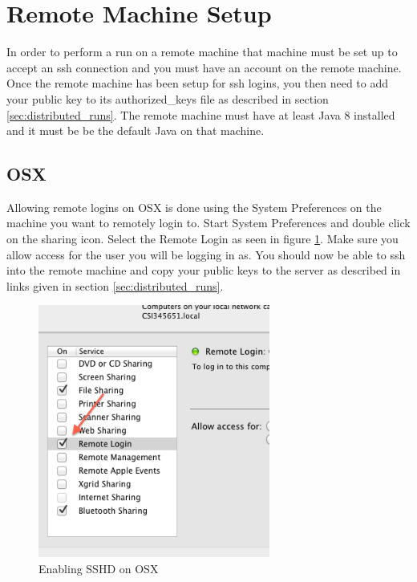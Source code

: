 \documentclass[11pt]{amsart}
\begin{document}
\section{Remote Machine Setup}
\label{sec:remote_machines}

In order to perform a run on a remote machine that machine must be set up to accept an ssh connection and you must have an account on the remote machine. Once the remote machine has been setup for ssh logins, you then need to add your public key to its authorized\_keys file as described in section \ref{sec:distributed_runs}. The remote machine must have at least Java 8 installed and it must be be the default Java on that machine.

\subsection{OSX }
Allowing remote logins on OSX is done using the System Preferences on the machine you want to remotely login to. Start System Preferences and double click on the sharing icon. Select the Remote Login as seen in figure \ref{fig:osx_sys}. Make sure you allow access for the user you will be logging in as. You should now be able to ssh into the remote machine and copy your public keys to the server as described in links given in section \ref{sec:distributed_runs}.

\begin{figure}[h]
\begin{center}
\vspace{.2in}
\centerline {
\includegraphics[width=3in]{images/sshd_on_osx.png}
}
\caption{Enabling SSHD on OSX}
\label{fig:osx_sys}
\end{center}
\end{figure}
\end{document}
